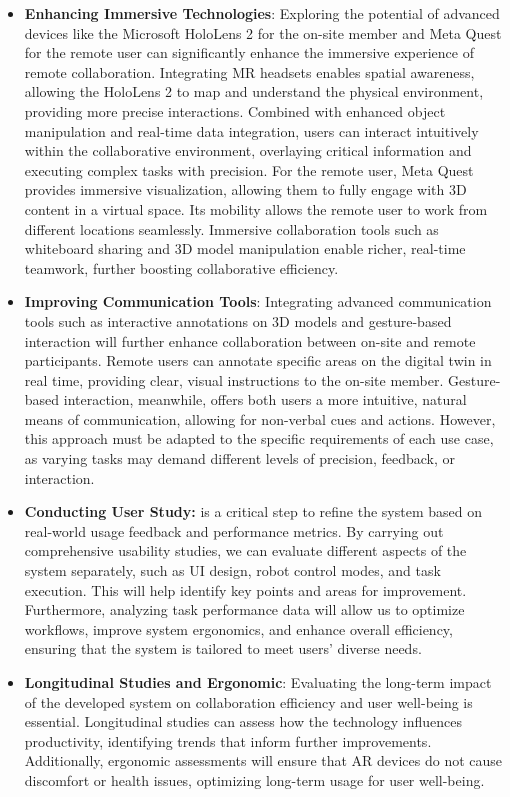 \begin{itemize}
    \item \textbf{Enhancing Immersive Technologies}: Exploring the potential of advanced devices like the Microsoft HoloLens 2 for the on-site member and Meta Quest for the remote user can significantly enhance the immersive experience of remote collaboration. Integrating \ac{MR} headsets enables spatial awareness, allowing the HoloLens 2 to map and understand the physical environment, providing more precise interactions. Combined with enhanced object manipulation and real-time data integration, users can interact intuitively within the collaborative environment, overlaying critical information and executing complex tasks with precision. 
    For the remote user, Meta Quest provides immersive visualization, allowing them to fully engage with 3D content in a virtual space. Its mobility allows the remote user to work from different locations seamlessly. Immersive collaboration tools such as whiteboard sharing and 3D model manipulation enable richer, real-time teamwork, further boosting collaborative efficiency. 
    \item \textbf{Improving Communication Tools}: Integrating advanced communication tools such as interactive annotations on 3D models and gesture-based interaction will further enhance collaboration between on-site and remote participants. Remote users can annotate specific areas on the digital twin in real time, providing clear, visual instructions to the on-site member. Gesture-based interaction, meanwhile, offers both users a more intuitive, natural means of communication, allowing for non-verbal cues and actions. However, this approach must be adapted to the specific requirements of each use case, as varying tasks may demand different levels of precision, feedback, or interaction.
    \item \textbf{Conducting User Study:} is a critical step to refine the system based on real-world usage feedback and performance metrics. By carrying out comprehensive usability studies, we can evaluate different aspects of the system separately, such as \ac{UI} design, robot control modes, and task execution. This will help identify key points and areas for improvement. Furthermore, analyzing task performance data will allow us to optimize workflows, improve system ergonomics, and enhance overall efficiency, ensuring that the system is tailored to meet users' diverse needs.
    \item \textbf{Longitudinal Studies and Ergonomic}: Evaluating the long-term impact of the developed system on collaboration efficiency and user well-being is essential. Longitudinal studies can assess how the technology influences productivity, identifying trends that inform further improvements. Additionally, ergonomic assessments will ensure that \ac{AR} devices do not cause discomfort or health issues, optimizing long-term usage for user well-being. 
\end{itemize}

